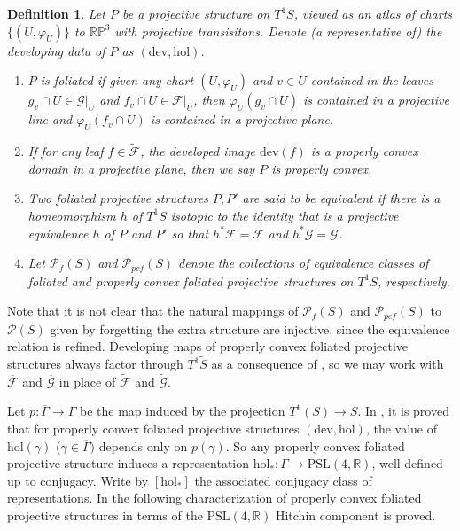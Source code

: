 \documentclass[12pt,a4paper]{amsart}
\newcommand{\bbR}{\mathbb R}
\theoremstyle{definition}
\theoremstyle{plain}
\newtheorem{definition}[theorem]{Definition}
\numberwithin{equation}{section}
\begin{document}
\begin{definition} Let $P$ be a projective structure on $T^1S$, viewed as an atlas of charts $\{ (U, \varphi_U)\}$ to $\mathbb{RP}^3$ with projective transisitons. Denote (a representative of) the developing data of $P$ as {\rm{$(\text{dev}, \text{hol})$}}.
\begin{enumerate} \item $P$ is {\rm{foliated}} if given any chart $(U, \varphi_U)$ and $v \in U$ contained in the leaves $g_v \cap U \in \mathcal{G}|_U$ and $f_v \cap U \in \mathcal{F}|_U$, then $\varphi_U(g_v \cap U)$ is contained in a projective line and $\varphi_U(f_v \cap U)$ is contained in a projective plane.
\item If for any leaf $f \in \widetilde{\mathcal{F}}$, the developed image {\rm{$\text{dev}(f)$}} is a properly convex domain in a projective plane, then we say $P$ is {\rm{properly convex}}.
\item Two foliated projective structures $P, P'$ are said to be equivalent if there is a homeomorphism $h$ of $T^1S$ isotopic to the identity that is a projective equivalence $h$ of $P$ and $P'$ so that $h^* \mathcal{F} = \mathcal{F}$ and $h^* \mathcal{G} = \mathcal{G}$.
\item Let $\mathcal{P}_f(S)$ and $\mathcal{P}_{pcf}(S)$ denote the collections of equivalence classes of foliated and properly convex foliated projective structures on $T^1S$, respectively.
\end{enumerate}
\end{definition}

Note that it is not clear that the natural mappings of $\mathcal{P}_{f}(S)$ and $\mathcal{P}_{pcf}(S)$ to $\mathcal{P}(S)$ given by forgetting the extra structure are injective, since the equivalence relation is refined. Developing maps of properly convex foliated projective structures always factor through $T^1\widetilde{S}$ as a consequence of \cite{guichard2008convex}, so we may work with $\overline{\mathcal{F}}$ and $\overline{\mathcal{G}}$ in place of $\widetilde{\mathcal{F}}$ and $\widetilde{\mathcal{G}}$.


Let $p: \overline{\Gamma} \to \Gamma$ be the map induced by the projection $T^1(S) \to S$. In \cite{guichard2008convex}, it is proved that for properly convex foliated projective structures $(\text{dev}, \text{hol})$, the value of $\text{hol}(\gamma)$ ($\gamma \in \overline{\Gamma})$ depends only on $p(\gamma)$. So any properly convex foliated projective structure induces a representation $\text{hol}_*: \Gamma \to \text{PSL}(4,\bbR)$, well-defined up to conjugacy. Write by $[\text{hol}_*]$ the associated conjugacy class of representations. In \cite{guichard2008convex} the following characterization of properly convex foliated projective structures in terms of the $\text{PSL}(4, \mathbb{R})$ Hitchin component is proved.
\end{document}
